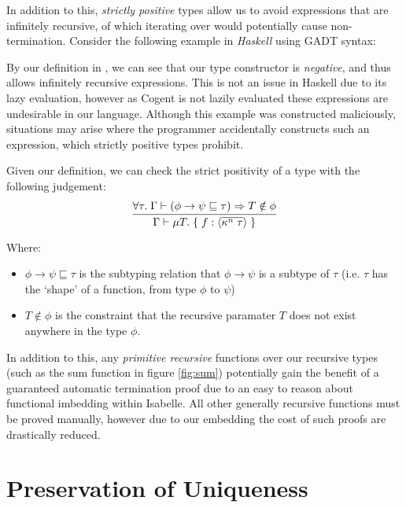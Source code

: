 In addition to this, \textit{strictly positive} types allow us to avoid expressions that are infinitely recursive,
of which iterating over  would potentially cause non-termination. Consider
the following example in \textit{Haskell} using GADT syntax:

\pagebreak



By our definition in , we can see that our type constructor is \textit{negative}, and
thus allows infinitely recursive expressions. This is not an issue in Haskell due to its lazy evaluation,
however as Cogent is not lazily evaluated these expressions are undesirable in our language. 
Although this example was constructed maliciously, situations may arise where the
programmer accidentally constructs such an expression, which strictly positive types prohibit.

Given our definition, we can check the strict positivity of a type with the following judgement:
$$
\infer{
    \Gamma \vdash \mu T.\; \{\; f: \langle \overline{\kappa^n\; \tau} \rangle\; \}
}{
   \forall \tau.\; \Gamma \vdash (\phi \rightarrow \psi \sqsubseteq \tau) \implies T \notin \phi
}
$$

Where:
\begin{itemize}
    \item 
        $\phi \rightarrow \psi \sqsubseteq \tau$ is the subtyping relation that $\phi \rightarrow \psi$
        is a subtype of $\tau$ (i.e. $\tau$ has the `shape' of a function, from type $\phi$ to $\psi$) 
    \item
        $T \notin \phi$ is the constraint that the recursive paramater $T$ does not exist anywhere in the type $\phi$.
\end{itemize}

In addition to this, any \textit{primitive recursive} functions over our recursive types 
(such as the sum function in figure \ref{fig:sum}) potentially gain the benefit of a guaranteed
automatic termination proof due to an easy to reason about functional imbedding within Isabelle.
All other generally recursive functions must be proved manually, however due to our embedding
the cost of such proofs are drastically reduced.

\section{Preservation of Uniqueness}

